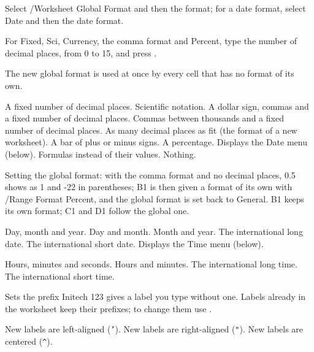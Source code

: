 \begin{Steps123}
\item Select /Worksheet Global Format and then the format; for a date
  format, select Date and then the date format.
\item For Fixed, Sci, Currency, the comma format and Percent, type the
  number of decimal places, from 0 to 15, and press .
\end{Steps123}
The new global format is used at once by every cell that has no format of
its own.
\begin{Options}
 A fixed number of decimal places.
 Scientific notation.
 A dollar sign, commas and a fixed number of decimal
  places.
\Option{,} Commas between thousands and a fixed number of decimal places.
 As many decimal places as fit (the format of a new
  worksheet).
\Option{+/-} A bar of plus or minus signs.
 A percentage.
 Displays the Date menu (below).
 Formulas instead of their values.
 Nothing.
\end{Options}
Setting the global format: with the comma format and no decimal places,
0.5 shows as 1 and -22 in parentheses; B1 is then given a format of its
own with /Range Format Percent, and the global format is set back to
General.  B1 keeps its own format; C1 and D1 follow the global one.


\begin{Options}
 Day, month and year.
 Day and month.
 Month and year.
 The international long date.
 The international short date.
 Displays the Time menu (below).
\end{Options}
\begin{Options}
 Hours, minutes and seconds.
 Hours and minutes.
 The international long time.
 The international short time.
\end{Options}

Sets the prefix Initech 123 gives a label you type without one.  Labels
already in the worksheet keep their prefixes; to change them use
.
\begin{Options}
 New labels are left-aligned (\texttt{'}).
 New labels are right-aligned (\texttt{"}).
 New labels are centered (\texttt{\textasciicircum}).
\end{Options}

